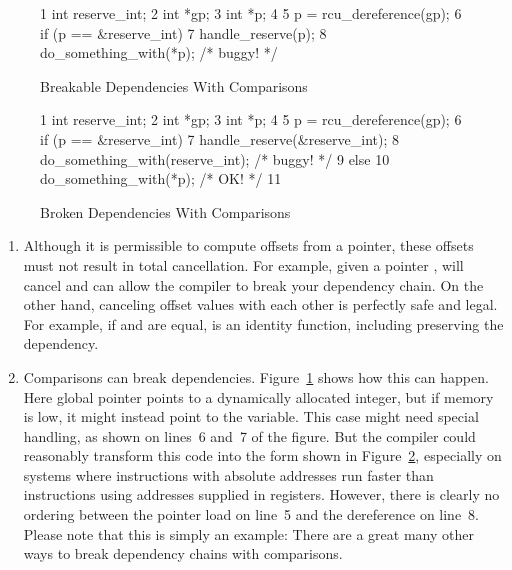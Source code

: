 \begin{figure}[tbp]
{ \scriptsize
\begin{verbbox}
 1 int reserve_int;
 2 int *gp;
 3 int *p;
 4
 5 p = rcu_dereference(gp);
 6 if (p == &reserve_int)
 7   handle_reserve(p);
 8 do_something_with(*p); /* buggy! */
\end{verbbox}
}
\centering
\theverbbox
\caption{Breakable Dependencies With Comparisons}
\label{fig:advsync:Breakable Dependencies With Comparisons}
\end{figure}

\begin{figure}[tbp]
{ \scriptsize
\begin{verbbox}
 1 int reserve_int;
 2 int *gp;
 3 int *p;
 4
 5 p = rcu_dereference(gp);
 6 if (p == &reserve_int) {
 7   handle_reserve(&reserve_int);
 8   do_something_with(reserve_int); /* buggy! */
 9 } else {
10   do_something_with(*p); /* OK! */
11 }
\end{verbbox}
}
\centering
\theverbbox
\caption{Broken Dependencies With Comparisons}
\label{fig:advsync:Broken Dependencies With Comparisons}
\end{figure}

\begin{enumerate}
\item	Although it is permissible to compute offsets from a
	pointer, these offsets must not result in total cancellation.
	For example, given a  pointer ,
	 will cancel and can allow the compiler
	to break your dependency chain.
	On the other hand, canceling offset values with each other
	is perfectly safe and legal.
	For example, if  and  are equal, 
	is an identity function, including preserving the dependency.
\item	Comparisons can break dependencies.
	Figure~\ref{fig:advsync:Breakable Dependencies With Comparisons}
	shows how this can happen.
	Here global pointer  points to a dynamically allocated
	integer, but if memory is low, it might instead point to
	the  variable.
	This  case might need special handling, as
	shown on lines~6 and~7 of the figure.
	But the compiler could reasonably transform this code into
	the form shown in
	Figure~\ref{fig:advsync:Broken Dependencies With Comparisons},
	especially on systems where instructions with absolute
	addresses run faster than instructions using addresses
	supplied in registers.
	However, there is clearly no ordering between the pointer
	load on line~5 and the dereference on line~8.
	Please note that this is simply an example: There are a great
	many other ways to break dependency chains with comparisons.
\end{enumerate}

